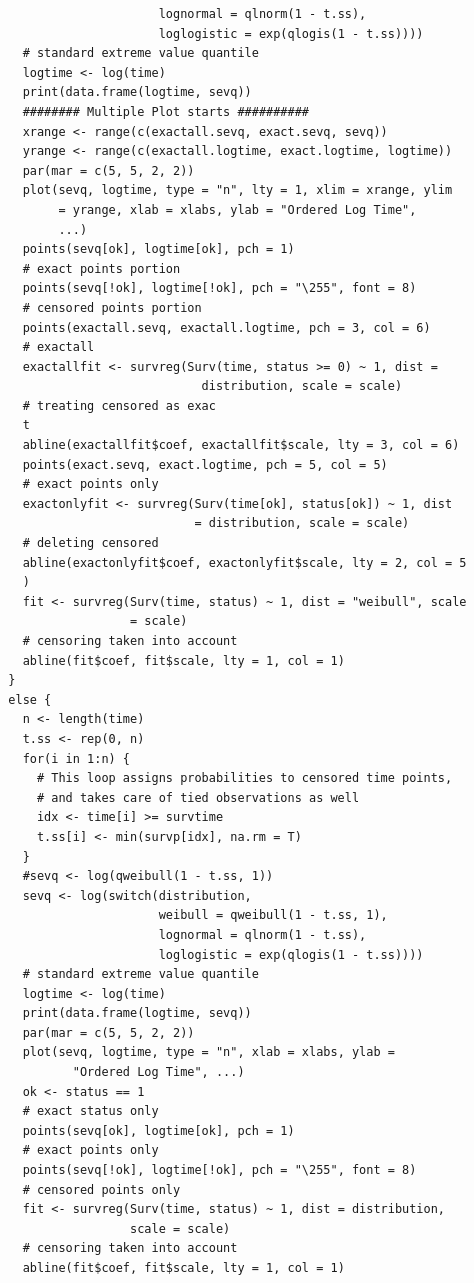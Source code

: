 \documentclass[
]{article}
\begin{document}
\begin{verbatim}
                       lognormal = qlnorm(1 - t.ss),
                       loglogistic = exp(qlogis(1 - t.ss))))
    # standard extreme value quantile
    logtime <- log(time)
    print(data.frame(logtime, sevq))
    ######## Multiple Plot starts ##########
    xrange <- range(c(exactall.sevq, exact.sevq, sevq))
    yrange <- range(c(exactall.logtime, exact.logtime, logtime))
    par(mar = c(5, 5, 2, 2))
    plot(sevq, logtime, type = "n", lty = 1, xlim = xrange, ylim
         = yrange, xlab = xlabs, ylab = "Ordered Log Time",
         ...)
    points(sevq[ok], logtime[ok], pch = 1)
    # exact points portion
    points(sevq[!ok], logtime[!ok], pch = "\255", font = 8)
    # censored points portion
    points(exactall.sevq, exactall.logtime, pch = 3, col = 6)
    # exactall
    exactallfit <- survreg(Surv(time, status >= 0) ~ 1, dist = 
                             distribution, scale = scale)
    # treating censored as exac
    t
    abline(exactallfit$coef, exactallfit$scale, lty = 3, col = 6)
    points(exact.sevq, exact.logtime, pch = 5, col = 5)
    # exact points only
    exactonlyfit <- survreg(Surv(time[ok], status[ok]) ~ 1, dist
                            = distribution, scale = scale)
    # deleting censored
    abline(exactonlyfit$coef, exactonlyfit$scale, lty = 2, col = 5
    )
    fit <- survreg(Surv(time, status) ~ 1, dist = "weibull", scale
                   = scale)
    # censoring taken into account
    abline(fit$coef, fit$scale, lty = 1, col = 1)
  }
  else {
    n <- length(time)
    t.ss <- rep(0, n)
    for(i in 1:n) {
      # This loop assigns probabilities to censored time points, 
      # and takes care of tied observations as well
      idx <- time[i] >= survtime
      t.ss[i] <- min(survp[idx], na.rm = T)
    }
    #sevq <- log(qweibull(1 - t.ss, 1))
    sevq <- log(switch(distribution,
                       weibull = qweibull(1 - t.ss, 1),
                       lognormal = qlnorm(1 - t.ss),
                       loglogistic = exp(qlogis(1 - t.ss))))
    # standard extreme value quantile
    logtime <- log(time)
    print(data.frame(logtime, sevq))
    par(mar = c(5, 5, 2, 2))
    plot(sevq, logtime, type = "n", xlab = xlabs, ylab = 
           "Ordered Log Time", ...)
    ok <- status == 1
    # exact status only 
    points(sevq[ok], logtime[ok], pch = 1)
    # exact points only
    points(sevq[!ok], logtime[!ok], pch = "\255", font = 8)
    # censored points only
    fit <- survreg(Surv(time, status) ~ 1, dist = distribution,
                   scale = scale)
    # censoring taken into account
    abline(fit$coef, fit$scale, lty = 1, col = 1)

\end{verbatim}
\end{document}
